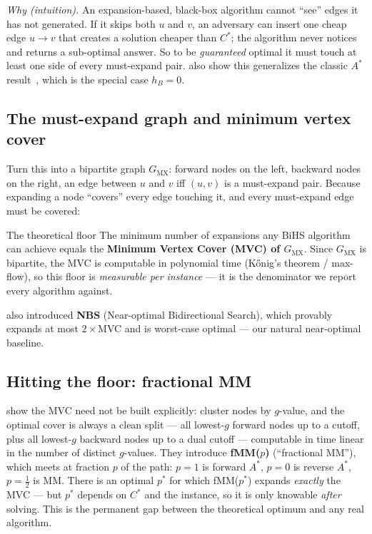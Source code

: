 \documentclass[11pt]{article}
\newcommand{\hB}{h_B}
\newcommand{\Cstar}{C^{*}}
\newcommand{\GMX}{G_{\mathrm{MX}}}
\begin{document}
\emph{Why (intuition).} An expansion-based, black-box algorithm cannot ``see'' edges it has
not generated. If it skips both $u$ and $v$, an adversary can insert one cheap edge $u\to v$
that creates a solution cheaper than $\Cstar$; the algorithm never notices and returns a
sub-optimal answer. So to be \emph{guaranteed} optimal it must touch at least one side of
every must-expand pair. \citet{eckerle2017sufficient} also show this generalizes the classic
$A^{*}$ result~\citep{dechter1985generalized}, which is the special case $\hB=0$.

\subsection{The must-expand graph and minimum vertex cover \citep{chen2017nbs}}
Turn this into a bipartite graph $\GMX$: forward nodes on the left, backward nodes on the
right, an edge between $u$ and $v$ iff $(u,v)$ is a must-expand pair. Because expanding a
node ``covers'' every edge touching it, and every must-expand edge must be covered:
\begin{keybox}{The theoretical floor}
The minimum number of expansions any BiHS algorithm can achieve equals the
\textbf{Minimum Vertex Cover (MVC) of $\GMX$}. Since $\GMX$ is bipartite, the MVC is
computable in polynomial time (K\H{o}nig's theorem / max-flow), so this floor is
\emph{measurable per instance} --- it is the denominator we report every algorithm against.
\end{keybox}
\citet{chen2017nbs} also introduced \textbf{NBS} (Near-optimal Bidirectional Search), which
provably expands at most $2\times$MVC and is worst-case optimal --- our natural
near-optimal baseline.

\subsection{Hitting the floor: fractional MM \citep{shaham2017minimal}}
\citet{shaham2017minimal} show the MVC need not be built explicitly: cluster nodes by
$g$-value, and the optimal cover is always a clean split --- all lowest-$g$ forward nodes up
to a cutoff, plus all lowest-$g$ backward nodes up to a dual cutoff --- computable in time
linear in the number of distinct $g$-values. They introduce \textbf{fMM($p$)}
(``fractional MM''), which meets at fraction $p$ of the path: $p{=}1$ is forward $A^{*}$,
$p{=}0$ is reverse $A^{*}$, $p{=}\tfrac12$ is MM. There is an optimal $p^{*}$ for which
fMM($p^{*}$) expands \emph{exactly} the MVC --- but $p^{*}$ depends on $\Cstar$ and the
instance, so it is only knowable \emph{after} solving. This is the permanent gap between the
theoretical optimum and any real algorithm.
\end{document}
